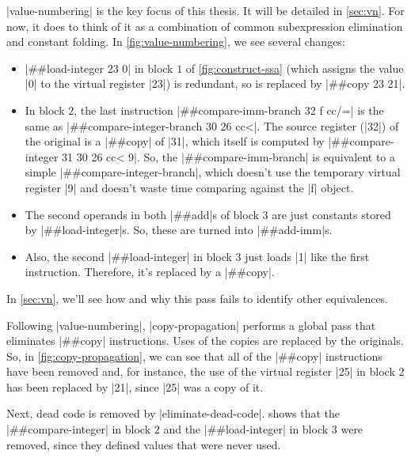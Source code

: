 \factor|value-numbering| is the key focus of this thesis.  It will be detailed
in \vref{sec:vn}.  For now, it does to think of it as a combination of common
subexpression elimination and constant folding.  In \vref{fig:value-numbering}, 
we see several changes:
%
\begin{itemize}
%
  \item \factor|##load-integer 23 0| in block $1$ of \vref{fig:construct-ssa}
  (which assigns the value \factor|0| to the virtual register \factor|23|) is
  redundant, so is replaced by \factor|##copy 23 21|.
%
  \item \begin{flushleft}
  In block $2$, the last instruction
  \factor|##compare-imm-branch 32 f cc/=|
  is the same as
  \factor|##compare-integer-branch 30 26 cc<|.
  The source register (\factor|32|) of the original is a \factor|##copy| of
  \factor|31|, which itself is computed by
  \factor|##compare-integer 31 30 26 cc< 9|.
  So, the \factor|##compare-imm-branch| is equivalent to a simple
  \factor|##compare-integer-branch|, which doesn't use the temporary virtual
  register \factor|9| and doesn't waste time comparing against the \factor|f|
  object.
  \end{flushleft}
%
  \item The second operands in both \factor|##add|s of block $3$ are just
  constants stored by \factor|##load-integer|s.  So, these are turned into
  \factor|##add-imm|s.
%
  \item Also, the second \factor|##load-integer| in block $3$ just loads
  \factor|1| like the first instruction.  Therefore, it's replaced by a
  \factor|##copy|.
\end{itemize}
%
\noindent In \cref{sec:vn}, we'll see how and why this pass fails to identify
other equivalences.


Following \factor|value-numbering|, \factor|copy-propagation| performs a global
pass that eliminates \factor|##copy| instructions.  Uses of the copies are
replaced by the originals.  So, in \vref{fig:copy-propagation}, we can see that
all of the \factor|##copy| instructions have been removed and, for instance,
the use of the virtual register \factor|25| in block $2$ has been replaced by
\factor|21|, since \factor|25| was a copy of it.


Next, dead code is removed by \factor|eliminate-dead-code|.
 shows that the \factor|##compare-integer| in
block $2$ and the \factor|##load-integer| in block $3$ were removed, since they
defined values that were never used.

